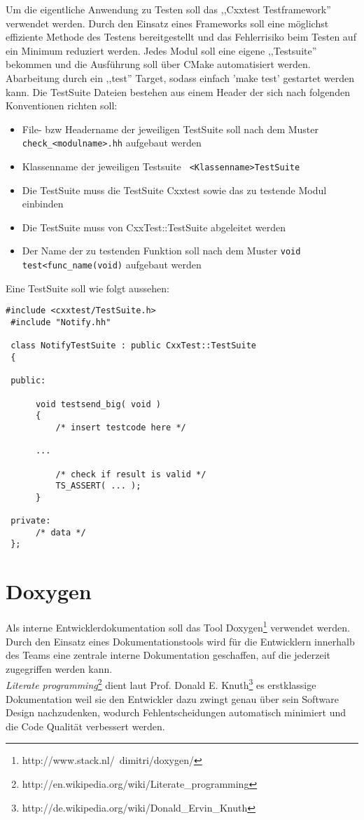 Um die eigentliche Anwendung zu Testen soll das ,,Cxxtest Testframework''
verwendet werden. Durch den Einsatz eines Frameworks soll eine möglichst effiziente Methode des Testens bereitgestellt
und das Fehlerrisiko beim Testen auf ein Minimum reduziert werden. Jedes Modul soll eine eigene ,,Testsuite'' bekommen und die
Ausführung soll über CMake automatisiert werden. Abarbeitung durch ein ,,test'' Target, sodass einfach 'make test' gestartet werden kann.
Die TestSuite Dateien bestehen aus einem Header der sich nach folgenden Konventionen richten soll: 

\begin{itemize}
	\item File- bzw Headername der jeweiligen TestSuite soll nach dem Muster \verb+check_<modulname>.hh+ aufgebaut werden
	\item Klassenname der jeweiligen Testsuite \verb+ <Klassenname>TestSuite+
	\item Die TestSuite muss die TestSuite Cxxtest sowie das zu testende Modul einbinden
	\item Die TestSuite muss von CxxTest::TestSuite abgeleitet werden 
	\item Der Name der zu testenden Funktion soll nach dem Muster \verb+void test<func_name(void)+ aufgebaut werden
\end{itemize}  


Eine TestSuite soll wie folgt aussehen:


\begin{lstlisting}[caption={TestSuite Template check\_notify.hh Beispielcodefragment für die Klasse ,,Notify''},label={lst:cxxtemp}]
 #include <cxxtest/TestSuite.h>
 #include "Notify.hh"
 
 class NotifyTestSuite : public CxxTest::TestSuite
 {
  
 public:
  
      void testsend_big( void )
      {
          /* insert testcode here */
 	  
 	  ...
 	   
          /* check if result is valid */    
          TS_ASSERT( ... );
      }
   
 private:
      /* data */
 };
\end{lstlisting}


\section{Doxygen}

Als interne Entwicklerdokumentation soll das Tool Doxygen\footnote{http://www.stack.nl/~dimitri/doxygen/} verwendet werden.
Durch den Einsatz eines Dokumentationstools wird für die Entwicklern innerhalb des Teams eine zentrale interne Dokumentation geschaffen,
auf die jederzeit zugegriffen werden kann. 
\\
\emph{Literate programming}\footnote{http://en.wikipedia.org/wiki/Literate\_programming} dient laut Prof. Donald E. Knuth\footnote{http://de.wikipedia.org/wiki/Donald\_Ervin\_Knuth} 
es erstklassige Dokumentation weil sie den Entwickler dazu zwingt genau über sein Software Design nachzudenken, wodurch
Fehlentscheidungen automatisch minimiert und die Code Qualität verbessert werden.